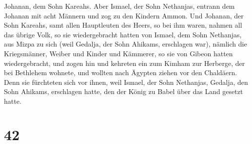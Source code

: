 Johanan, dem Sohn Kareahs.  Aber Ismael, der Sohn
Nethanjas, entrann dem Johanan mit acht Männern und zog zu den Kindern
Ammon.  Und Johanan, der Sohn Kareahs, samt allen
Hauptleuten des Heers, so bei ihm waren, nahmen all das übrige Volk, so
sie wiedergebracht hatten von Ismael, dem Sohn Nethanjas, aus Mizpa zu
sich (weil Gedalja, der Sohn Ahikams, erschlagen war), nämlich die
Kriegsmänner, Weiber und Kinder und Kämmerer, so sie von Gibeon hatten
wiedergebracht,  und zogen hin und kehreten ein zum Kimham
zur Herberge, der bei Bethlehem wohnete, und wollten nach Ägypten ziehen
vor den Chaldäern.  Denn sie fürchteten sich vor ihnen,
weil Ismael, der Sohn Nethanjas, Gedalja, den Sohn Ahikams, erschlagen
hatte, den der König zu Babel über das Land gesetzt hatte.

\hypertarget{section-41}{%
\section{42}\label{section-41}}

